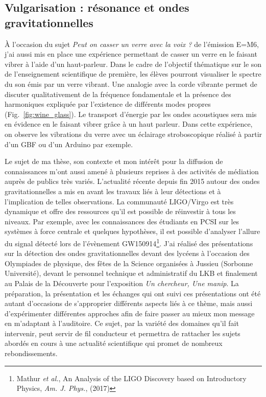 \documentclass[12pt,a4paper]{article}
\begin{document}
\subsection{Vulgarisation : résonance et ondes gravitationnelles}

À l'occasion du sujet \textit{Peut on casser un verre avec la voix ?} de l'émission E=M6, j'ai aussi mis en place une expérience permettant de casser un verre en le faisant vibrer à l'aide d'un haut-parleur.
Dans le cadre de l'objectif thématique sur le son de l'enseignement scientifique de première, les élèves pourront visualiser le spectre du son émis par un verre vibrant.
Une analogie avec la corde vibrante permet de discuter qualitativement de la fréquence fondamentale et la présence des harmoniques expliquée par l'existence de différents modes propres (Fig.~\ref{fig:wine_glass}).
Le transport d'énergie par les ondes acoustiques sera mis en évidence en le faisant vibrer grâce à un haut parleur.
Dans cette expérience, on observe les vibrations du verre avec un éclairage stroboscopique réalisé à partir d'un GBF ou d'un Arduino par exemple.

Le sujet de ma thèse, son contexte et mon intérêt pour la diffusion de connaissances m'ont aussi amené à plusieurs reprises à des activités de médiation auprès de publics très variés.
L'actualité récente depuis fin 2015 autour des ondes gravitationnelles a mis en avant les travaux liés à leur détections et à l'implication de telles observations.
La communauté LIGO/Virgo est très dynamique et offre des ressources qu'il est possible de réinvestir à tous les niveaux.
Par exemple, avec les connaissances des étudiants en PCSI sur les systèmes à force centrale et quelques hypothèses, il est possible d'analyser l'allure du signal détecté lors de l'évènement GW150914\footnote{Mathur \textit{et al.}, An Analysis of the LIGO Discovery based on Introductory Physics, \textit{Am. J. Phys.}, (2017)}.
J'ai réalisé des présentations sur la détection des ondes gravitationnelles devant des lycéens à l'occasion des Olympiades de physique, des fêtes de la Science organisées à Jussieu (Sorbonne Université), devant le personnel technique et administratif du LKB et finalement au Palais de la Découverte pour l'exposition \textit{Un chercheur, Une manip}.
La préparation, la présentation et les échanges qui ont suivi ces présentations ont été autant d'occasions de s'approprier différents aspects liés à ce thème, mais aussi d'expérimenter différentes approches afin de faire passer au mieux mon message en m'adaptant à l'auditoire.
Ce sujet, par la variété des domaines qu'il fait intervenir, peut servir de fil conducteur et permettra de rattacher les sujets abordés en cours à une actualité scientifique qui promet de nombreux rebondissements.
\end{document}
